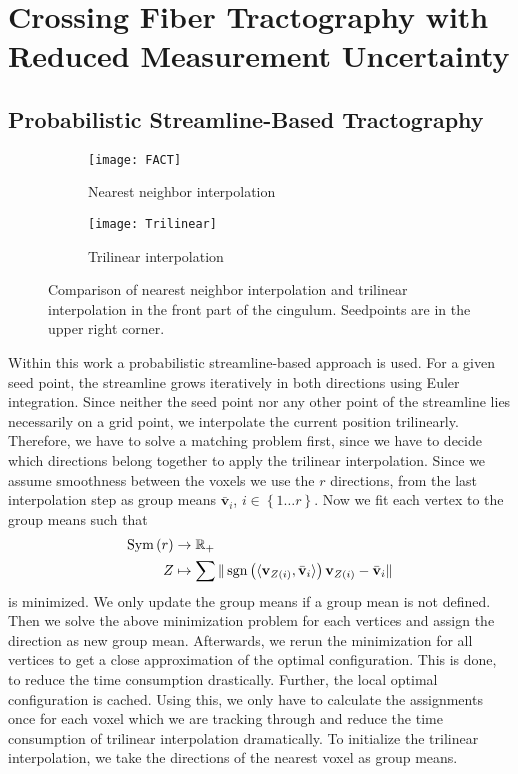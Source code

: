 \section{Crossing Fiber Tractography with Reduced Measurement Uncertainty}

\subsection{Probabilistic Streamline-Based Tractography}
\begin{figure}[h]
	\centering
	\begin{subfigure}[b]{0.45\linewidth}
		\texttt{[image: FACT]}
		\caption{Nearest neighbor interpolation}
	\end{subfigure}
	\begin{subfigure}[b]{0.45\linewidth}
		\texttt{[image: Trilinear]}
		\caption{Trilinear interpolation}
	\end{subfigure}
	\caption{Comparison of nearest neighbor interpolation and trilinear
	interpolation in the front part of the cingulum. Seedpoints are in the
upper right corner.}

	\label{fig:interpolation-comparison}
\end{figure}
Within this work a probabilistic streamline-based approach is used. For a given
seed point, the streamline grows iteratively in both directions using Euler
integration. Since neither the seed point nor any other point of the streamline
lies necessarily on a grid point, we interpolate the current position trilinearly. Therefore,
we have to solve a matching problem first, since we have to decide which
directions belong together to apply the trilinear interpolation. Since we assume
smoothness between the voxels we use the $r$ directions, from the last
interpolation step as group means $\bar{\mathbf{v}}_i$, $i \in \left\{ 1\dots r 
\right\}$. Now we fit each vertex to the group means such
that 
\begin{align}
	\text{Sym} \left( r  \right) & \rightarrow \mathbb{R}_+ \\ 
	Z & \mapsto \sum \| \operatorname*{sgn} \left( \langle \mathbf{v}_{Z \left( i \right)}
	, \bar{\mathbf{v}}_i \rangle  \right) \mathbf{v}_{Z \left( i \right)} -
\bar{\mathbf{v}}_i
	\|
\end{align}
is minimized. We only update the group means if a group mean is not defined.
Then we solve the above minimization problem for each vertices and assign the direction as new
group mean. Afterwards, we rerun the minimization for all vertices to get a
close approximation of the optimal configuration. This is done,
to reduce the time consumption drastically. Further, the local optimal
configuration is cached. Using this, we only have to calculate the assignments
once for each voxel which we are tracking through and reduce the time
consumption of trilinear interpolation dramatically. 
To initialize the trilinear interpolation, we take the directions of the nearest voxel as group means.

